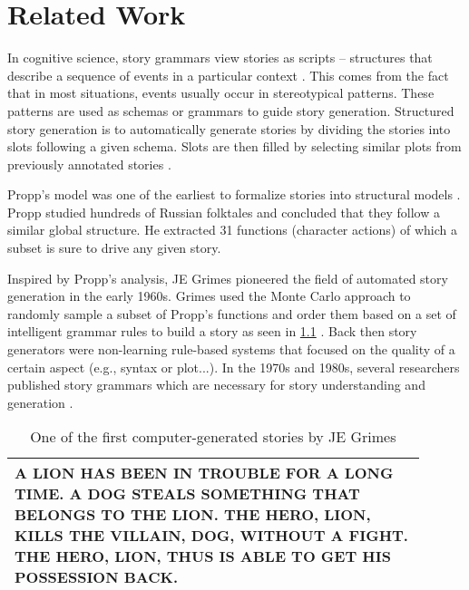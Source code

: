 \chapter{Related Work}
\label{ch:related_work}


In cognitive science, story grammars view stories as scripts -- structures that describe a sequence of events in a particular context \citep{schank2013scripts}. This comes from the fact that in most situations, events usually occur in stereotypical patterns. These patterns are used as schemas or grammars to guide story generation. Structured story generation is to automatically generate stories by dividing the stories into slots following a given schema. Slots are then filled by selecting similar plots from previously annotated stories \citep{alhussain2021automatic}.

Propp's model was one of the earliest to formalize stories into structural models \citep{propp1968morphology}. Propp studied hundreds of Russian folktales and concluded that they follow a similar global structure. He extracted 31 functions (character actions) of which a subset is sure to drive any given story.

Inspired by Propp's analysis, JE Grimes pioneered the field of automated story generation in the early 1960s. Grimes used the Monte Carlo approach to randomly sample a subset of Propp's functions and order them based on a set of intelligent grammar rules to build a story as seen in \cref{tab:grimes-story-sample} \citep{ryan2017grimes}. Back then story generators were non-learning rule-based systems that focused on the quality of a certain aspect (e.g., syntax or plot...). In the 1970s and 1980s, several researchers published story grammars which are necessary for story understanding and generation \citep{rumelhart1975notes, thorndyke1977cognitive, wilensky1983story}.

\begin{table}[h]
\centering
\begin{tabular}{p{0.9\linewidth}}
\hline
\uppercase{A lion has been in trouble for a long time. A dog steals something that belongs to the lion. The hero, lion, kills the villain, dog, without a fight. The hero, lion, thus is able to get his possession back.} \\ 
\hline
\end{tabular}
\caption{One of the first computer-generated stories by JE Grimes}
\label{tab:grimes-story-sample}
\end{table}

